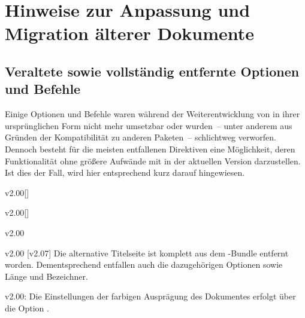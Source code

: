 \chapter{Hinweise zur Anpassung und Migration älterer Dokumente}
\section{%
  Veraltete sowie vollständig entfernte Optionen und Befehle%
  \label{sec:obsolete}%
}
%
Einige Optionen und Befehle waren während der Weiterentwicklung von \TUDScript
in ihrer ursprünglichen Form nicht mehr umsetzbar oder wurden~-- unter anderem 
aus Gründen der Kompatibilität zu anderen Paketen~-- schlichtweg verworfen. 
Dennoch besteht für die meisten entfallenen Direktiven eine Möglichkeit, deren 
Funktionalität ohne größere Aufwände mit \TUDScript in der aktuellen Version 
\vTUDScript{} darzustellen. Ist dies der Fall, wird hier entsprechend kurz 
darauf hingewiesen.

\NewDocumentCommand{}


\begin{Obsolete}{v2.00}[]
  {}
\begin{Obsolete}{v2.00}[]
  {}
\begin{Obsolete}{v2.00}
  {}
\begin{Obsolete}{v2.00}
  {}
\printobsoletelist
%
[v2.07]%
Die alternative Titelseite ist komplett aus dem \TUDScript-Bundle entfernt 
worden. Dementsprechend entfallen auch die dazugehörigen Optionen sowie Länge 
und Bezeichner.
\end{Obsolete}
\end{Obsolete}
\end{Obsolete}
\end{Obsolete}

\begin{Obsolete}{v2.00:}
  {}
\printobsoletelist%
%
Die Einstellungen der farbigen Ausprägung des Dokumentes erfolgt über die 
Option .
\end{Obsolete}

